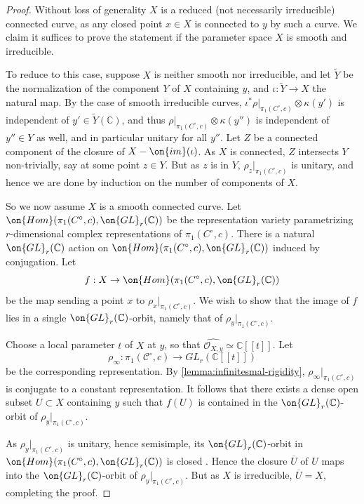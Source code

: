 \documentclass[12 pt]{amsart}
\theoremstyle{plain}
\theoremstyle{definition}
\theoremstyle{remark}
\numberwithin{equation}{section}
\begin{document}
\begin{proof}
Without loss of generality $X$ is a reduced (not necessarily irreducible) connected curve, as any closed point $x\in X$ is connected to $y$ by such a curve. We claim it suffices to prove the statement if the parameter space $X$ is smooth and irreducible. 

To reduce to this case, suppose $X$ is neither smooth nor irreducible, and let $\tilde Y$ be the normalization of the component $Y$ of $X$ containing $y$, and $\iota:
\tilde Y\to X$ the natural map. By the case of smooth irreducible curves, $\iota^*\rho|_{\pi_1(C^\circ, c)}\otimes \kappa(y')$ is independent of $y'\in \tilde Y(\mathbb{C})$, and thus $\rho|_{\pi_1(C^\circ, c)}\otimes \kappa(y'')$ is independent of $y''\in Y$ as well, and in particular unitary for all $y''$. Let $Z$ be a connected component of the closure of $X-\on{im}(\iota)$. As $X$ is connected, $Z$ intersects $Y$ non-trivially, say at some point $z\in Y$. But as $z$ is in $Y$, $\rho_z|_{\pi_1(C^\circ, c)}$ is unitary, and hence we are done by induction on the number of components of $X$.

So we now assume $X$ is a smooth connected curve. Let $\on{Hom}(\pi_1(C^\circ, c), \on{GL}_r(\mathbb{C}))$ be the representation variety parametrizing $r$-dimensional complex representations of $\pi_1(C^\circ, c)$. There is a natural $\on{GL}_r(\mathbb{C})$ action on $\on{Hom}(\pi_1(C^\circ, c), \on{GL}_r(\mathbb{C}))$ induced by conjugation. Let $$f: X\to \on{Hom}(\pi_1(C^\circ, c), \on{GL}_r(\mathbb{C}))$$ be the map sending a point $x$ to $\rho_x|_{\pi_1(C^\circ, c)}$. We wish to show that the image of $f$ lies in a single $\on{GL}_r(\mathbb{C})$-orbit, namely that of $\rho_y|_{\pi_1(C^\circ, c)}$.

Choose a local parameter $t$ of $X$ at $y$, so that $\widehat{\mathscr{O}_{X,y}}\simeq \mathbb{C}[[t]]$. Let $$\rho_\infty: \pi_1(\mathscr{C}^\circ, c)\to GL_r(\mathbb{C}[[t]])$$ be the corresponding representation. By \autoref{lemma:infinitesmal-rigidity}, $\rho_\infty|_{\pi_1(C^\circ, c)}$ is conjugate to a constant representation. It follows that there exists a dense open
subset $U\subset X$ containing $y$ such that $f(U)$ is contained in the
$\on{GL}_r(\mathbb{C})$-orbit of $\rho_y|_{\pi_1(C^\circ, c)}$.

As $\rho_y|_{\pi_1(C^\circ, c)}$ is unitary, hence semisimple, its $\on{GL}_r(\mathbb{C})$-orbit in $\on{Hom}(\pi_1(C^\circ, c), \on{GL}_r(\mathbb{C}))$ is closed \cite[Theorem 30]{sikora2012character}. Hence the closure $\overline{U}$ of $U$ maps into the $\on{GL}_r(\mathbb{C})$-orbit of $\rho_y|_{\pi_1(C^\circ, c)}$. But as $X$ is irreducible, $\overline{U}=X$, completing the proof.
\end{proof}
\end{document}
